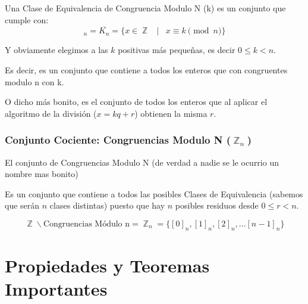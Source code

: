 \documentclass[12pt, fleqn]{report}                             %
\DeclareMathOperator \Space {\quad}                             %
\DeclareMathOperator \MiniSpace {\;}                            %
\newcommand \Such {\MiniSpace|\MiniSpace}                       %
\DeclareMathOperator \Integers  {\mathbb{Z}}                     %
\begin{document}
                Una Clase de Equivalencia de Congruencia Modulo N (k) es un conjunto
                que cumple con:
                \begin{equation}
                    [k]_n = \overline{K_n} = \{ x \in \Integers \Such x \equiv k \pmod{n} \}
                \end{equation}

                Y obviamente elegimos a las $k$ positivas más pequeñas, es decir 
                $0 \leq k < n$.

                Es decir, es un conjunto que contiene a todos los enteros que con
                congruentes modulo n con k.

                O dicho más bonito, es el conjunto de todos los enteros que al aplicar
                el algoritmo de la división ($x = kq+r$) obtienen la misma $r$.\\

            \subsubsection*{Conjunto Cociente: Congruencias Modulo N ($\Integers_n$)}

                El conjunto de Congruencias Modulo N (de verdad a nadie se le ocurrio 
                un nombre mas bonito)  

                Es  un conjunto que contiene a todos las posibles Clases de Equivalencia
                (sabemos que serán $n$ clases distintas) puesto que hay $n$ posibles residuos
                desde $0 \leq r < n$.

                \begin{equation}
                    \Integers \backslash \text{Congruencias Módulo n} = 
                        \Integers_n = \{ [0]_n , [1]_n, [2]_n, \dots  [n-1]_n\}
                \end{equation}






    \clearpage
    \section{Propiedades y Teoremas Importantes}


\end{document}
